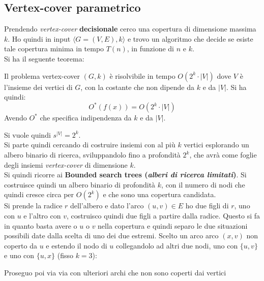 \documentclass[a4paper,12pt, oneside]{book}
\begin{document}
\subsection{Vertex-cover parametrico}
Prendendo \textit{vertex-cover} \textbf{decisionale} cerco una copertura di
dimensione massima $k$. Ho quindi in input $\langle G=(V,E),k\rangle$ e trovo un
algoritmo che decide se esiste tale copertura minima in tempo $T(n)$, in
funzione di $n$ e $k$.\\
Si ha il seguente teorema:
\begin{teorema}
  Il problema vertex-cover $(G,k)$ è risolvibile in tempo $O(2^k\cdot |V|)$ dove
  $V$ è l'insieme dei vertici di $G$, con la costante che non dipende da $k$ e
  da $|V|$. Si ha quindi:
  \[O^*(f(x))=O(2^k\cdot |V|)\]
  Avendo $O^*$ che specifica indipendenza da $k$ e da $|V|$.
\end{teorema}
Si vuole quindi $s^{|V|}=2^k$.\\
Si parte quindi cercando di costruire insiemi con al più $k$ vertici esplorando
un albero binario di ricerca, sviluppandolo fino a profondità $2^k$, che avrà
come foglie degli insiemi \textit{vertex-cover} di dimensione $k$.\\
Si quindi ricorre ai \textbf{Bounded search trees (\textit{alberi di ricerca
    limitati})}. Si costruisce quindi un albero binario di profondità $k$, con
il numero di nodi che quindi cresce circa per $O(2^k)$ e che sono una copertura
candidata. \\
Si prende la radice $r$ dell'albero e dato l'arco $(u,v)\in E$ ho due figli di
$r$, uno con $u$ e l’altro con $v$, costruisco quindi due figli a partire dalla
radice. Questo si fa in quanto basta avere o $u$ o $v$ nella copertura e quindi
separo le due situazioni possibili date dalla scelta di uno dei due
estremi. Scelto un arco arco $(x,v)$ non coperto da $u$ e estendo il nodo di $u$
collegandolo ad altri due nodi, uno con $\{u, v\}$ e uno con $\{u, x\}$ (fisso
$k=3$): 
\begin{center}
\end{center}
Proseguo poi via via con ulteriori archi che non sono coperti dai vertici
\end{document}
